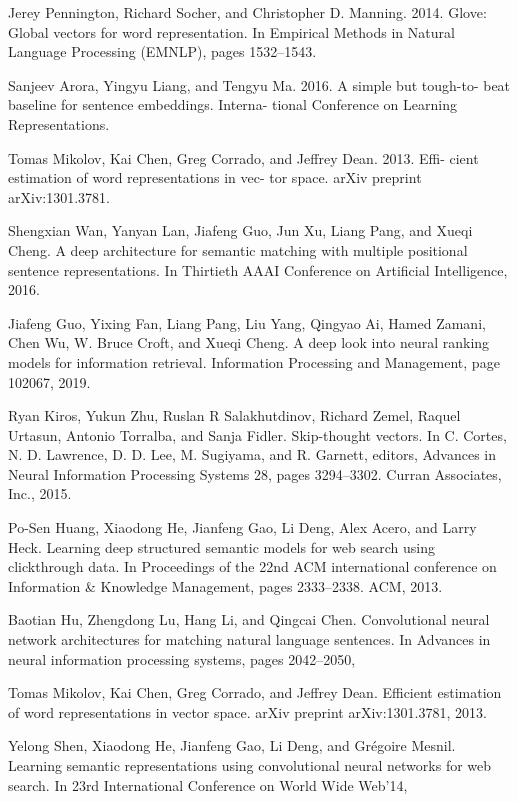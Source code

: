 \documentclass{llncs}
\begin{document}
%
%
\begin{thebibliography}{}
%
 Jerey Pennington, Richard Socher, and Christopher D. Manning. 2014. Glove: Global vectors for word representation. In Empirical Methods in Natural Language Processing (EMNLP), pages 1532–1543.

 Sanjeev Arora, Yingyu Liang, and Tengyu Ma. 2016. A simple but tough-to- beat baseline for sentence embeddings. Interna- tional Conference on Learning Representations.

 Tomas Mikolov, Kai Chen, Greg Corrado, and Jeffrey Dean. 2013. Effi- cient estimation of word representations in vec- tor space. arXiv preprint arXiv:1301.3781.

Shengxian Wan, Yanyan Lan, Jiafeng Guo, Jun Xu, Liang Pang, and Xueqi Cheng. A deep architecture for semantic matching with multiple positional sentence representations. In Thirtieth AAAI Conference on Artificial Intelligence, 2016.

 Jiafeng Guo, Yixing Fan, Liang Pang, Liu Yang, Qingyao Ai, Hamed Zamani, Chen Wu, W. Bruce Croft, and Xueqi Cheng. A deep look into neural ranking models for information retrieval. Information Processing and Management, page 102067, 2019.

 Ryan Kiros, Yukun Zhu, Ruslan R Salakhutdinov, Richard Zemel, Raquel Urtasun, Antonio Torralba, and Sanja Fidler. Skip-thought vectors. In C. Cortes, N. D. Lawrence, D. D. Lee, M. Sugiyama, and R. Garnett, editors, Advances in Neural Information Processing Systems 28, pages 3294–3302. Curran Associates, Inc., 2015.

 Po-Sen Huang, Xiaodong He, Jianfeng Gao, Li Deng, Alex Acero, and Larry Heck. Learning deep structured semantic models for web search using clickthrough data. In Proceedings of the 22nd ACM international conference on Information \& Knowledge Management, pages 2333–2338. ACM, 2013.

 Baotian Hu, Zhengdong Lu, Hang Li, and Qingcai Chen. Convolutional neural network architectures for matching natural language sentences. In Advances in neural information processing systems, pages 2042–2050,


  Tomas Mikolov, Kai Chen, Greg Corrado, and Jeffrey Dean. Efficient estimation of word representations in vector space. arXiv preprint arXiv:1301.3781, 2013.

 Yelong Shen, Xiaodong He, Jianfeng Gao, Li Deng, and Grégoire Mesnil. Learning semantic representations using convolutional neural networks for web search. In 23rd International Conference on World Wide Web’14,


\end{thebibliography}
\end{document}
